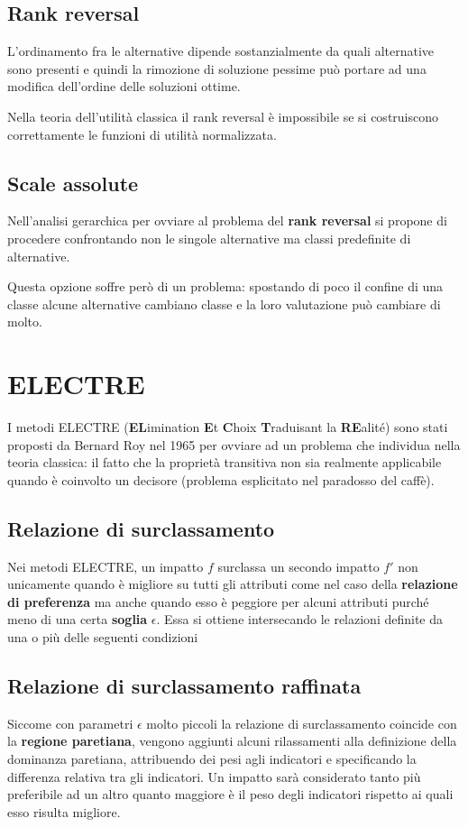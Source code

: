\documentclass[\main/main.tex]{subfiles}
\begin{document}
\subsection{Rank reversal}
L'ordinamento fra le alternative dipende sostanzialmente da quali alternative sono presenti e quindi la rimozione di soluzione pessime può portare ad una modifica dell'ordine delle soluzioni ottime.

Nella teoria dell'utilità classica il rank reversal è impossibile se si costruiscono correttamente le funzioni di utilità normalizzata.

\subsection{Scale assolute}
Nell'analisi gerarchica per ovviare al problema del \textbf{rank reversal} si propone di procedere confrontando non le singole alternative ma classi predefinite di alternative.

Questa opzione soffre però di un problema: spostando di poco il confine di una classe alcune alternative cambiano classe e la loro valutazione può cambiare di molto.

\section{ELECTRE}
I metodi ELECTRE (\textbf{EL}imination \textbf{E}t \textbf{C}hoix \textbf{T}raduisant la \textbf{RE}alité) sono stati proposti da Bernard Roy nel 1965 per ovviare ad un problema che individua nella teoria classica: il fatto che la proprietà transitiva non sia realmente applicabile quando è coinvolto un decisore (problema esplicitato nel paradosso del caffè).

\subsection{Relazione di surclassamento}
Nei metodi ELECTRE, un impatto $f$ surclassa un secondo impatto $f'$ non unicamente quando è migliore su tutti gli attributi come nel caso della \textbf{relazione di preferenza} ma anche quando esso è peggiore per alcuni attributi purché meno di una certa \textbf{soglia} $\epsilon$. Essa si ottiene intersecando le relazioni definite da una o più delle seguenti condizioni

\subsection{Relazione di surclassamento raffinata}
Siccome con parametri $\epsilon$ molto piccoli la relazione di surclassamento coincide con la \textbf{regione paretiana}, vengono aggiunti alcuni rilassamenti alla definizione della dominanza paretiana, attribuendo dei pesi agli indicatori e specificando la differenza relativa tra gli indicatori. Un impatto sarà considerato tanto più preferibile ad un altro quanto maggiore è il peso degli indicatori rispetto ai quali esso risulta migliore.
\end{document}
